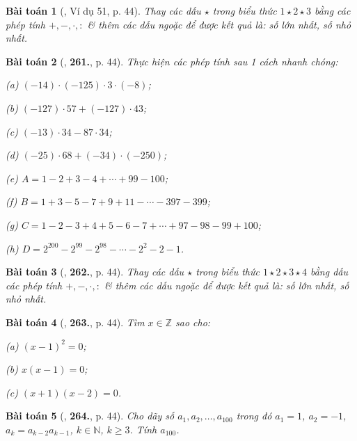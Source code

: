 \documentclass{article}
\numberwithin{equation}{section}
\newtheorem{baitoan}{Bài toán}
\begin{document}
\begin{baitoan}[\cite{Binh_Toan_6_tap_1}, Ví dụ 51, p. 44]
	Thay các dấu $\star$ trong biểu thức $1\star2\star3$ bằng các phép tính $+,-,\cdot,:$ \& thêm các dấu ngoặc để được kết quả là: số lớn nhất, số nhỏ nhất.
\end{baitoan}

\begin{baitoan}[\cite{Binh_Toan_6_tap_1}, \textbf{261.}, p. 44]
	Thực hiện các phép tính sau 1 cách nhanh chóng:
	\begin{enumerate*}
		\item[(a)] $(-14)\cdot(-125)\cdot3\cdot(-8)$;
		\item[(b)] $(-127)\cdot57 + (-127)\cdot43$;
		\item[(c)] $(-13)\cdot34 - 87\cdot34$;
		\item[(d)] $(-25)\cdot68 + (-34)\cdot(-250)$;
		\item[(e)] $A = 1 - 2 + 3 - 4 + \cdots + 99 - 100$;
		\item[(f)] $B = 1 + 3 - 5 - 7 + 9 + 11 - \cdots - 397 - 399$;
		\item[(g)] $C = 1 - 2 - 3 + 4 + 5 - 6 - 7 + \cdots + 97 - 98 - 99 + 100$;
		\item[(h)] $D = 2^{200} - 2^{99} - 2^{98} - \cdots - 2^2 - 2 - 1$.
	\end{enumerate*}
\end{baitoan}

\begin{baitoan}[\cite{Binh_Toan_6_tap_1}, \textbf{262.}, p. 44]
	Thay các dấu  $\star$ trong biểu thức $1\star2\star3\star4$ bằng dấu các phép tính $+,-,\cdot,:$ \& thêm các dấu ngoặc để được kết quả là: số lớn nhất, số nhỏ nhất.
\end{baitoan}

\begin{baitoan}[\cite{Binh_Toan_6_tap_1}, \textbf{263.}, p. 44]
	Tìm $x\in\mathbb{Z}$ sao cho:
	\begin{enumerate*}
		\item[(a)] $(x - 1)^2 = 0$;
		\item[(b)] $x(x - 1) = 0$;
		\item[(c)] $(x + 1)(x - 2) = 0$.
	\end{enumerate*}
\end{baitoan}

\begin{baitoan}[\cite{Binh_Toan_6_tap_1}, \textbf{264.}, p. 44]
	Cho dãy số $a_1,a_2,\ldots,a_{100}$ trong đó $a_1 = 1$, $a_2 = -1$, $a_k = a_{k-2}a_{k-1}$, $k\in\mathbb{N}$, $k\ge 3$. Tính $a_{100}$.
\end{baitoan}
\end{document}
